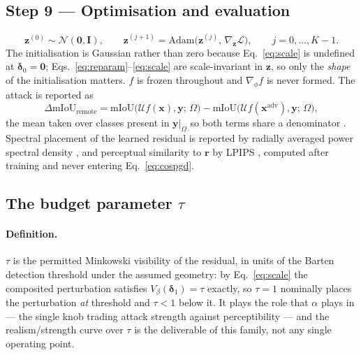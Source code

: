 \subsection{Step 9 — Optimisation and evaluation}

\begin{equation}
  \mathbf{z}^{(0)}\sim\mathcal{N}(\mathbf{0},\mathbf{I}),\qquad
  \mathbf{z}^{(j+1)}=\mathrm{Adam}\big(\mathbf{z}^{(j)},\,
  \nabla_{\mathbf{z}}\mathcal{L}\big),\qquad j=0,\dots,K-1.
\end{equation}
The initialisation is Gaussian rather than zero because
Eq.~\eqref{eq:scale} is undefined at $\boldsymbol{\delta}_0=\mathbf{0}$;
Eqs.~\eqref{eq:reparam}--\eqref{eq:scale} are scale-invariant in
$\mathbf{z}$, so only the \emph{shape} of the initialisation matters.
$f$ is frozen throughout and $\nabla_{\phi}f$ is never formed. The
attack is reported as
\begin{equation}
  \Delta\mathrm{mIoU}_{\mathrm{remote}}
  =\mathrm{mIoU}\big(\mathcal{U}f(\mathbf{x}),\mathbf{y};\,\Omega\big)
  -\mathrm{mIoU}\big(\mathcal{U}f(\mathbf{x}^{\mathrm{adv}}),\mathbf{y};\,\Omega\big),
\end{equation}
the mean taken over classes present in $\mathbf{y}|_\Omega$ so both
terms share a denominator \citep{cordts2016cityscapes}. Spectral
placement of the learned residual is reported by radially averaged power
spectral density \citep{ruzanski2011rapsd}, and perceptual similarity to
$\mathbf{r}$ by LPIPS \citep{zhang2018lpips}, computed after training
and never entering Eq.~\eqref{eq:cospgd}.

\subsection{The budget parameter $\tau$}
\label{sec:tau}

\paragraph{Definition.} $\tau$ is the permitted Minkowski visibility of
the residual, in units of the Barten detection threshold under the
assumed geometry: by Eq.~\eqref{eq:scale} the composited perturbation
satisfies $V_\beta(\boldsymbol{\delta}_1)=\tau$ exactly, so $\tau=1$
nominally places the perturbation \emph{at} threshold and $\tau<1$
below it. It plays the role that $\alpha$ plays in
\citet{tan2021lap} --- the single knob trading attack strength against
perceptibility --- and the realism/strength curve over $\tau$ is the
deliverable of this family, not any single operating point.

